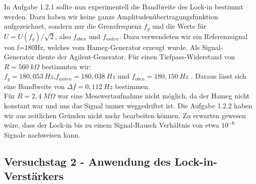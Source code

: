 \documentclass{scrartcl}						%
\begin{document}
			 In Aufgabe 1.2.1 sollte nun experimentell die Bandbreite des Lock-in bestimmt werden.
			 Dazu haben wir keine ganze Amplitudenübertragungsfunktion aufgezeichnet, sondern nur die Grenzfrequenz $ f_{g} $ und die Werte für $ U=U(f_{g})/\sqrt{2}$, also $ f_{oben} $ und $ f_{unten} $. Dazu verwendeten wir ein Referenzsignal von f=180Hz, welches vom Hameg-Generator erzeugt wurde. Als Signal-Generator diente der Agilent-Generator.
			 Für einen Tiefpass-Widerstand von $ R=560 \ k\Omega $ bestimmten wir: \\
			 $ f_{g}=180,053 \ Hz$,$f_{unten}=180,038 \ Hz $ und $f_{oben}=180,150 \ Hz$ .
			 Daraus lässt sich eine Bandbreite von $ \Delta f = 0,112 \ Hz$ bestimmen.\\
			 Für $ R=2,4 \ M\Omega$ war eine Messwertaufnahme nicht möglich, da der Hameg nicht konstant war und uns das Signal immer weggedriftet ist.
			 \newline
			 Die Aufgabe 1.2.2 haben wir aus zeitlichen Gründen nicht mehr bearbeiten können. Zu erwarten gewesen wäre, dass der Lock-in bis zu einem Signal-Rausch Verhältnis von etwa $ 10^{-6} $ Signale nachweisen kann.
			
		\subsection{Versuchstag 2 - Anwendung des Lock-in-Verstärkers}
			
\end{document}
